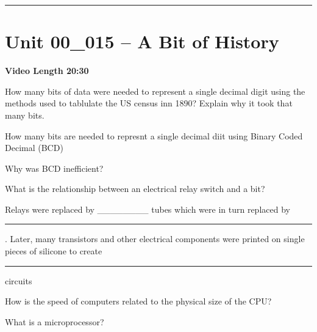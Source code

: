 \documentclass[letterpaper,12pt]{exam}
\newcommand{\unit}{Unit 00}
\begin{document}
\begin{questions}
\begin{samepage}
    \question 
    \vspace{5mm}
\end{samepage}

\par
\rule{0.5\textwidth}{.4pt} %
\section*{\unit\_015 -- A Bit of History}
\par{\selectfont\textbf{Video Length 20:30}}
\begin{samepage}
    \question How many bits of data were needed to represent a single decimal digit using the methods used to tablulate the US census inn 1890?
    \vspace{20mm}  Explain why it took that many bits.
\end{samepage}

\begin{samepage}
    \question How many bits are needed to represnt a single decimal diit using Binary Coded Decimal (BCD)
    \vspace{5mm}
\end{samepage}
\begin{samepage}
    \question Why was BCD inefficient?  
    \vspace{5mm}
\end{samepage}
\begin{samepage}
    \question What is the relationship between an electrical relay switch and a bit?
    \vspace{10mm}
\end{samepage}

\begin{samepage}
    \question Relays were replaced by \_\_\_\_\_\_\_\_ tubes which were in turn replaced by \rule{2cm}{0.15mm}.  Later, many transistors and other electrical components were printed on single pieces of silicone to create \rule{2cm}{0.15mm} circuits
    \vspace{5mm}
\end{samepage}
\par
\begin{samepage}
    \question How is the speed of computers related to the physical size of the CPU?
    \vspace{5mm}
\end{samepage}
\par
\begin{samepage}
    \question What is a microprocessor?
    \vspace{5mm}
\end{samepage}
\par


\end{questions}
\end{document}
